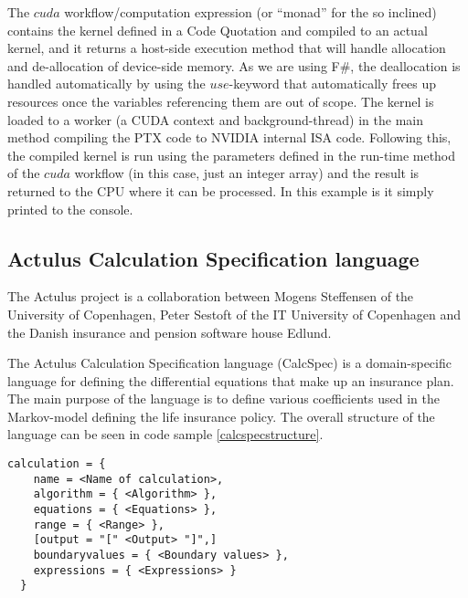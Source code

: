 The $cuda$ workflow/computation expression (or ``monad'' for the so inclined) contains the kernel defined in a Code Quotation and compiled to an actual kernel, and it returns a host-side execution method that will handle allocation and de-allocation of device-side memory. 
As we are using F\#, the deallocation is handled automatically by using the $use$-keyword that automatically frees up resources once the variables referencing them are out of scope. 
The kernel is loaded to a worker (a CUDA context and background-thread) in the main method compiling the PTX code to NVIDIA internal ISA code. %
Following this, the compiled kernel is run using the parameters defined in the run-time method of the $cuda$ workflow (in this case, just an integer array) and the result is returned to the CPU where it can be processed. 
In this example is it simply printed to the console. 

\subsection{Actulus Calculation Specification language}\label{subsec:background:calcspec}
The Actulus project is a collaboration between Mogens Steffensen of the University of Copenhagen, Peter Sestoft of the IT University of Copenhagen and the Danish insurance and pension software house Edlund.

The Actulus Calculation Specification language (CalcSpec) is a domain-specific language for defining the differential equations that make up an insurance plan.
The main purpose of the language is to define various coefficients used in the Markov-model defining the life insurance policy.
The overall structure of the language can be seen in code sample \ref{calcspecstructure}.

\begin{lstlisting}[caption=CalcSpec structure, label=calcspecstructure, language=calcspec]
calculation = {
    name = <Name of calculation>,
    algorithm = { <Algorithm> },
    equations = { <Equations> },
    range = { <Range> },
    [output = "[" <Output> "]",]
    boundaryvalues = { <Boundary values> },
    expressions = { <Expressions> }
  }
\end{lstlisting}

